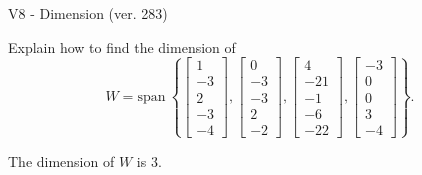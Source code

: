 \begin{exercise}
  \begin{exerciseTitle}V8 - Dimension (ver. 283)\end{exerciseTitle}
  \begin{exerciseStatement}
    Explain how to find the dimension of 
\[W=\mathrm{span}\ \left\{\left[\begin{array}{r}
1 \\
-3 \\
2 \\
-3 \\
-4
\end{array}\right] , \left[\begin{array}{r}
0 \\
-3 \\
-3 \\
2 \\
-2
\end{array}\right] , \left[\begin{array}{r}
4 \\
-21 \\
-1 \\
-6 \\
-22
\end{array}\right] , \left[\begin{array}{r}
-3 \\
0 \\
0 \\
3 \\
-4
\end{array}\right]\right\}.\]



  \end{exerciseStatement}
  \begin{exerciseAnswer}
   The dimension of \(W\) is  \(3\).
  


  \end{exerciseAnswer}
\end{exercise}
